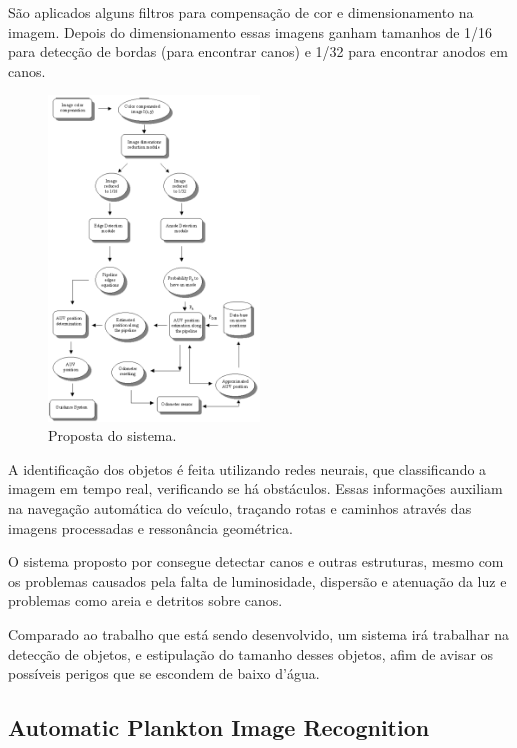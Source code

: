 São aplicados alguns filtros para compensação de cor e dimensionamento na imagem. Depois do dimensionamento essas imagens ganham tamanhos de 1/16 para detecção de bordas (para encontrar canos) e 1/32 para encontrar anodos em canos.
\begin{figure}[h]
	\caption{\label{fig:forestflow}Proposta do sistema.}
	\begin{center}
	    \includegraphics[width=0.5\textwidth]{resources/flowchartforest}
	\end{center}
\end{figure}

A identificação dos objetos é feita utilizando redes neurais, que classificando a imagem em tempo real, verificando se há obstáculos. Essas informações auxiliam na navegação automática do veículo, traçando rotas e caminhos através das imagens processadas e ressonância geométrica.

O sistema proposto por  consegue detectar canos e outras estruturas, mesmo com os problemas causados pela falta de luminosidade, dispersão e atenuação da luz e problemas como areia e detritos sobre canos.

Comparado ao trabalho que está sendo desenvolvido, um sistema irá trabalhar na detecção de objetos, e estipulação do tamanho desses objetos, afim de avisar os possíveis perigos que se escondem de baixo d'água.

\subsection{Automatic Plankton Image Recognition}

